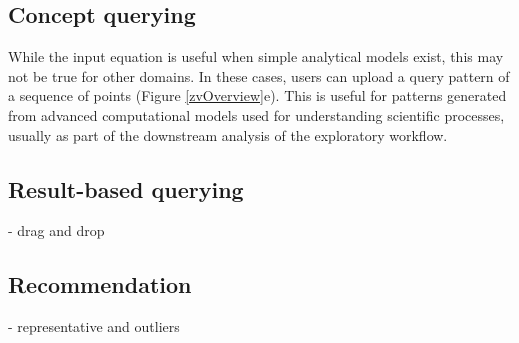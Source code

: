 \subsection{Concept querying}
 While the input equation is useful when simple analytical models exist, this may not be true for other domains. In these cases, users can upload a query pattern of a sequence of points (Figure \ref{zvOverview}e). This is useful for patterns generated from advanced computational models used for understanding scientific processes, usually as part of the downstream analysis of the exploratory workflow. %
\subsection{Result-based querying}
- drag and drop
\subsection{Recommendation}
- representative and outliers

